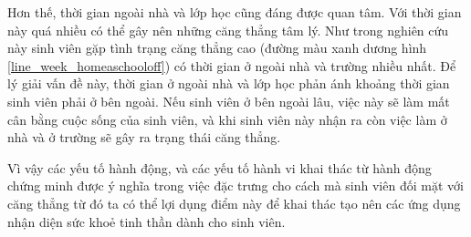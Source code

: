 Hơn thế, thời gian ngoài nhà và lớp học cũng đáng được quan tâm. Với thời gian này quá nhiều có thể gây nên những căng thẳng tâm lý. Như trong nghiên cứu này sinh viên gặp tình trạng căng thẳng cao (đường màu xanh dương hình \ref{line_week_homeaschooloff}) có thời gian ở ngoài nhà và trường nhiều nhất. Để lý giải vấn đề này, thời gian ở ngoài nhà và lớp học phản ánh khoảng thời gian sinh viên phải ở bên ngoài. Nếu sinh viên ở bên ngoài lâu, việc này sẽ làm mất cân bằng cuộc sống của sinh viên, và khi sinh viên này nhận ra còn việc làm ở nhà và ở trường sẽ gây ra trạng thái căng thẳng.


Vì vậy các yếu tố hành động, và các yếu tố hành vi khai thác từ hành động chứng minh được ý nghĩa trong việc đặc trưng cho cách mà sinh viên đối mặt với căng thẳng từ đó ta có thể lợi dụng điểm này để khai thác tạo nên các ứng dụng nhận diện sức khoẻ tinh thần dành cho sinh viên.


